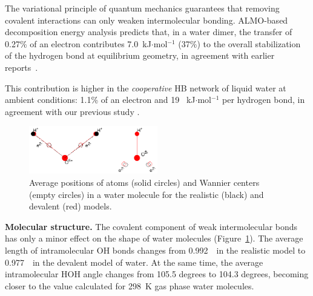 \documentclass[aps,prl,reprint,amsmath,amssymb]{revtex4-1}
\begin{document}
The variational principle of quantum mechanics guarantees that removing covalent interactions can only weaken intermolecular bonding. 
ALMO-based decomposition energy analysis predicts that, in a water dimer, the transfer of 0.27\% of an electron contributes  7.0~kJ$\cdot$mol$^{-1}$ (37\%) to the overall stabilization of the hydrogen bond at equilibrium geometry, in agreement with earlier reports~\cite{stevens1987frozen,chen1996energy,piquemal2005csov,khaliullin2009electron}. 

This contribution is higher in the \emph{cooperative} HB network of liquid water at ambient conditions: 1.1\% of an electron and 19 ~kJ$\cdot$mol$^{-1}$ per hydrogen bond, in agreement with our previous study \cite{kuhne2014nature}.

\begin{figure}
\includegraphics[width=0.5\textwidth]{acoord}
\caption{Average positions of atoms (solid circles) and Wannier centers (empty circles) in a water molecule for the realistic (black) and devalent (red) models. 
} \label{Fig:acoord}
\end{figure}

\textbf{Molecular structure.} The covalent component of weak intermolecular bonds has only a minor effect on the shape of water molecules (Figure~\ref{Fig:acoord}). 
The average length of intramolecular OH bonds changes from 0.992~\Ang\ in the realistic model to 0.977~\Ang\ in the devalent model of water. 
At the same time, the average intramolecular HOH angle changes from 105.5 degrees to 104.3 degrees, becoming closer to the value calculated for 298~K gas phase water molecules.
\end{document}
